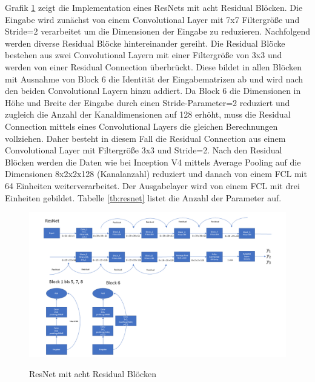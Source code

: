 Grafik \ref{fig:resnet} zeigt die Implementation eines ResNets mit acht Residual Blöcken. Die Eingabe wird zunächst von einem Convolutional Layer mit 7x7 Filtergröße und Stride=2 verarbeitet um die Dimensionen der Eingabe zu reduzieren. Nachfolgend werden diverse Residual Blöcke hintereinander gereiht. Die Residual Blöcke bestehen aus zwei Convolutional Layern mit einer Filtergröße von 3x3 und werden von einer Residual Connection überbrückt. Diese bildet in allen Blöcken mit Ausnahme von Block 6 die Identität der Eingabematrizen ab und wird nach den beiden Convolutional Layern hinzu addiert. Da Block 6 die Dimensionen in Höhe und Breite der Eingabe durch einen Stride-Parameter=2 reduziert und zugleich die Anzahl der Kanaldimensionen auf 128 erhöht, muss die Residual Connection mittels eines Convolutional Layers die gleichen Berechnungen vollziehen. Daher besteht in diesem Fall die Residual Connection aus einem Convolutional Layer mit Filtergröße 3x3 und Stride=2. Nach den Residual Blöcken werden die Daten wie bei Inception V4 mittels Average Pooling auf die Dimensionen 8x2x2x128 (Kanalanzahl) reduziert und danach von einem FCL mit 64 Einheiten weiterverarbeitet. Der Ausgabelayer wird von einem FCL mit drei Einheiten gebildet. Tabelle \ref{tb:resnet} listet die Anzahl der Parameter auf.

\begin{figure}
\centering
\caption[Caption for LOF]{ResNet mit acht Residual Blöcken}
\includegraphics[scale=0.75]{pictures/Inception/ResNet}
\label{fig:resnet}
\end{figure}

